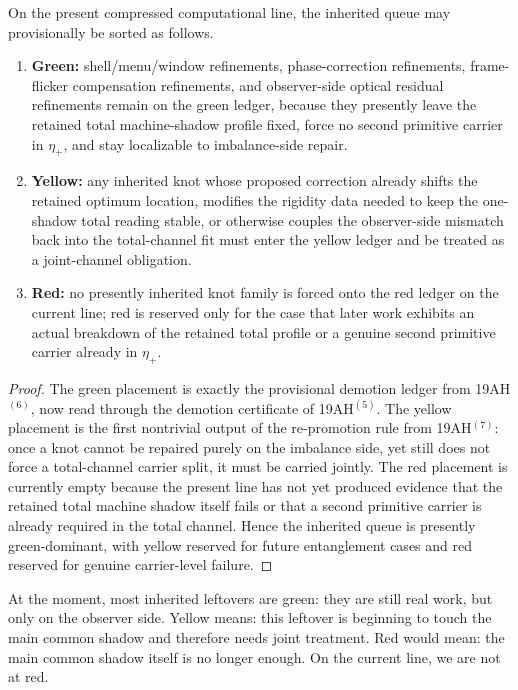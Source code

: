 \begin{proposition}
On the present compressed computational line, the inherited queue may provisionally be sorted as follows.
\begin{enumerate}[leftmargin=2em]
 \item \textbf{Green:} shell/menu/window refinements, phase-correction refinements, frame-flicker compensation refinements, and observer-side optical residual refinements remain on the green ledger, because they presently leave the retained total machine-shadow profile fixed, force no second primitive carrier in \(\eta_+\), and stay localizable to imbalance-side repair.
 \item \textbf{Yellow:} any inherited knot whose proposed correction already shifts the retained optimum location, modifies the rigidity data needed to keep the one-shadow total reading stable, or otherwise couples the observer-side mismatch back into the total-channel fit must enter the yellow ledger and be treated as a joint-channel obligation.
 \item \textbf{Red:} no presently inherited knot family is forced onto the red ledger on the current line; red is reserved only for the case that later work exhibits an actual breakdown of the retained total profile or a genuine second primitive carrier already in \(\eta_+\).
\end{enumerate}
\end{proposition}

\begin{proof}
The green placement is exactly the provisional demotion ledger from 19AH$^{(6)}$, now read through the demotion certificate of 19AH$^{(5)}$. The yellow placement is the first nontrivial output of the re-promotion rule from 19AH$^{(7)}$: once a knot cannot be repaired purely on the imbalance side, yet still does not force a total-channel carrier split, it must be carried jointly. The red placement is currently empty because the present line has not yet produced evidence that the retained total machine shadow itself fails or that a second primitive carrier is already required in the total channel. Hence the inherited queue is presently green-dominant, with yellow reserved for future entanglement cases and red reserved for genuine carrier-level failure.
\end{proof}

\begin{corollary}
At the moment, most inherited leftovers are green: they are still real work, but only on the observer side. Yellow means: this leftover is beginning to touch the main common shadow and therefore needs joint treatment. Red would mean: the main common shadow itself is no longer enough. On the current line, we are not at red.
\end{corollary}

